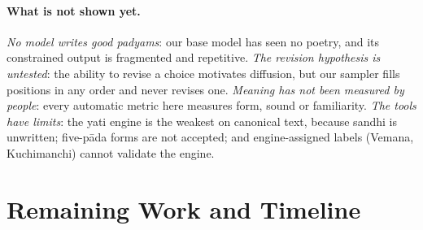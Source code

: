 \documentclass[11pt]{article}
\begin{document}
\paragraph{What is not shown yet.} \emph{No model writes good padyams}: our base model has seen no poetry,
and its constrained output is fragmented and repetitive. \emph{The revision hypothesis is untested}:
the ability to revise a choice motivates diffusion, but our sampler fills positions in any order and never
revises one. \emph{Meaning has not been measured by people}: every
automatic metric here measures form, sound or familiarity. \emph{The tools have limits}: the yati engine is
the weakest on canonical text, because sandhi is unwritten; five-pāda forms are not accepted; and
engine-assigned labels (Vemana, Kuchimanchi) cannot validate the engine.

\section{Remaining Work and Timeline}\label{sec:remaining}
\end{document}
